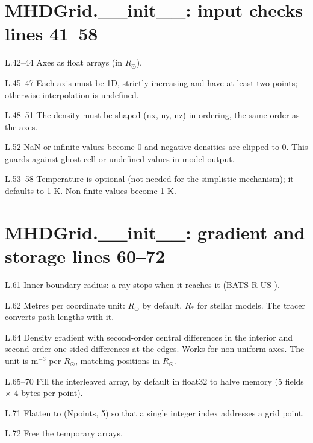 \section*{\normalsize MHDGrid.\_\_init\_\_: input checks \hfill{\small\mdseries\color{gray}lines 41--58}}

\begin{lines}
\item[L.42–44] Axes as float arrays (in $R_\odot$).
\item[L.45–47] Each axis must be 1D, strictly increasing and have at least two points; otherwise interpolation is undefined.
\item[L.48–51] The density must be shaped (nx, ny, nz) in  ordering, the same order as the axes.
\item[L.52] NaN or infinite values become 0 and negative densities are clipped to 0. This guards against ghost-cell or undefined values in model output.
\item[L.53–58] Temperature is optional (not needed for the simplistic mechanism); it defaults to 1 K. Non-finite values become 1 K.
\end{lines}
\section*{\normalsize MHDGrid.\_\_init\_\_: gradient and storage \hfill{\small\mdseries\color{gray}lines 60--72}}

\begin{lines}
\item[L.61] Inner boundary radius: a ray stops when it reaches it (BATS-R-US ).
\item[L.62] Metres per coordinate unit: $R_\odot$ by default, $R_\ast$ for stellar models. The tracer converts path lengths with it.
\item[L.64] Density gradient with second-order central differences in the interior and second-order one-sided differences at the edges. Works for non-uniform axes. The unit is m$^{-3}$ per $R_\odot$, matching positions in $R_\odot$.
\item[L.65–70] Fill the interleaved array, by default in float32 to halve memory (5 fields $\times$ 4 bytes per point).
\item[L.71] Flatten to (Npoints, 5) so that a single integer index addresses a grid point.
\item[L.72] Free the temporary arrays.
\end{lines}
